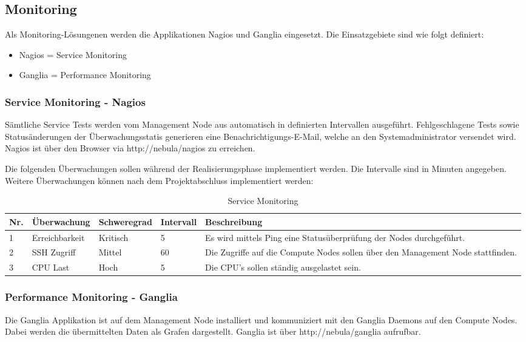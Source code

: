 \subsection{Monitoring}
Als Monitoring-Lösungenen werden die Applikationen Nagios und Ganglia eingesetzt. Die Einsatzgebiete sind wie folgt definiert:
\begin{itemize} 
\item {Nagios = Service Monitoring}
\item {Ganglia = Performance Monitoring}
\end{itemize}

\subsubsection{Service Monitoring - Nagios}
Sämtliche Service Tests werden vom Management Node aus automatisch in definierten Intervallen ausgeführt. Fehlgeschlagene Tests sowie Statusänderungen der Überwachungsstatis generieren eine Benachrichtigungs-E-Mail, welche an den Systemadministrator versendet wird. Nagios ist über den Browser via http://nebula/nagios zu erreichen.\newline

Die folgenden Überwachungen sollen während der Realisierungsphase implementiert werden. Die Intervalle sind in Minuten angegeben. Weitere Überwachungen können nach dem Projektabschluss implementiert werden:


\begin{table}[H]
\begin{tabular}[t]{p{0.6cm}p{2.5cm}p{2.2cm}p{1.5cm}p{8.8cm}}
\hline
\rowcolor{heading}\textbf{Nr.} & \textbf{Überwachung} & \textbf{Schweregrad} & \textbf{Intervall} &\textbf{Beschreibung} \\\hline
1 & Erreichbarkeit & Kritisch & 5 & Es wird mittels Ping eine Statusüberprüfung der Nodes durchgeführt. \\\hline
2 & SSH Zugriff & Mittel & 60 & Die Zugriffe auf die Compute Nodes sollen über den Management Node stattfinden.  \\\hline
3 & CPU Last & Hoch & 5 & Die CPU's sollen ständig ausgelastet sein.  \\\hline
\end{tabular}
\caption{Service Monitoring}
\end{table}

\subsubsection{Performance Monitoring - Ganglia}
Die Ganglia Applikation ist auf dem Management Node installiert und kommuniziert mit den Ganglia Daemons auf den Compute Nodes. Dabei werden die übermittelten Daten als Grafen dargestellt. Ganglia ist über http://nebula/ganglia aufrufbar.


